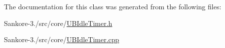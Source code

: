 The documentation for this class was generated from the following files\-:\begin{DoxyCompactItemize}
\item 
Sankore-\/3./src/core/\hyperlink{_u_b_idle_timer_8h}{U\-B\-Idle\-Timer.\-h}\item 
Sankore-\/3./src/core/\hyperlink{_u_b_idle_timer_8cpp}{U\-B\-Idle\-Timer.\-cpp}\end{DoxyCompactItemize}
